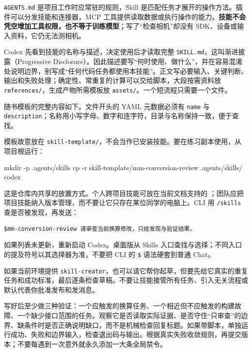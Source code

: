 \texttt{AGENTS.md} 是项目工作时应常驻的规则，Skill 是匹配任务才展开的操作方法。插件可以分发技能和连接器，MCP 工具提供读取数据或执行操作的能力。\textbf{技能不会凭空增加工具权限，也不等于训练模型}；写了“检查相机”却没有 SDK、设备或输入资料，它仍无法测相机。

Codex 先看到技能的名称与描述，决定使用后才读取完整 \texttt{SKILL.md}，这叫渐进披露（Progressive Disclosure）。因此描述要写“何时使用、做什么”，并在容易混淆处说明边界，别写成“任何代码任务都使用本技能”。正文写必要输入、关键判断、输出和失败处理；确定性、常重复的计算可以交给脚本，大段按需资料放 \texttt{references/}，生成产物所需模板放 \texttt{assets/}。一个短流程只需要一个文件。

\begin{example}
随书模板的完整内容如下。文件开头的 YAML 元数据必须有 \texttt{name} 与 \texttt{description}；名称用小写字母、数字和连字符，目录与名称保持一致，便于查找。

模板故意放在 \texttt{skill-template/}，不会当作已安装技能。要在练习副本使用，从项目根运行：
\begin{tbash}
mkdir -p .agents/skills
cp -r skill-template/mm-conversion-review .agents/skills/
codex
\end{tbash}
这是仓库内共享的放置方式。个人跨项目技能可放在当前文档支持的 ；团队应把项目技能纳入版本管理，而不要让它只存在某位同学的电脑上。CLI 用 \texttt{/skills} 查是否被发现，再发送：
\begin{lstlisting}[language={}]
$mm-conversion-review 请审查当前换算修改，只给发现与验证结果。
\end{lstlisting}
如果列表未更新，重新启动 Codex。桌面版从 Skills 入口查找与选择；不同入口的提及符号以其选择器为准，不要把 CLI 的 \texttt{\$} 语法硬套到普通 Chat。
\end{example}

如果当前环境提供 \texttt{skill-creator}，也可以请它帮你起草，但要先给它真实的重复任务和成功标准，最后逐条检查草稿。不要让技能接管所有任务、引入无关流程或默认代表你批准发布和发消息。

写好后至少做三种验证：一个应触发的换算任务、一个相近但不应触发的构建故障、一个缺少接口范围的任务。观察它是否读取实际证据、是否守住“只审查”的边界、缺条件时是否正确说明缺口，而不是机械检查回复标题。如果带脚本，单独运行成功、失败和边界输入，检查退出码与输出。根据真实失败收敛规则，再提交版本；不要每遇到一次意外就永久添加一大条全局禁令。

